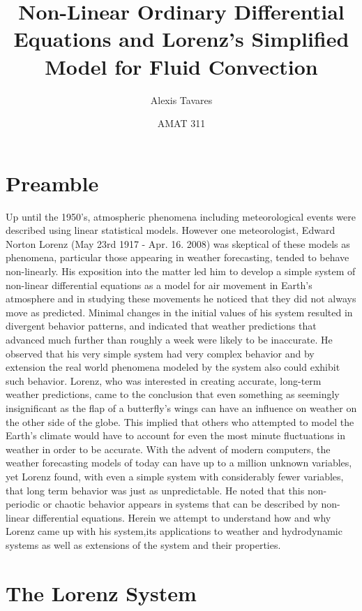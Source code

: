 \documentclass[letterpaper,titlepage,10pt]{article}
\title{Non-Linear Ordinary Differential Equations and Lorenz's Simplified Model for Fluid Convection}
\author{Alexis Tavares}
\date{AMAT 311}
\begin{document}
\maketitle{}
\tableofcontents{}
\newpage

\section{Preamble}
Up until the 1950's, atmospheric phenomena including meteorological events were described using linear statistical models. However one meteorologist, Edward Norton Lorenz (May 23rd 1917 - Apr. 16. 2008) was skeptical of these models as phenomena, particular those appearing in weather forecasting, tended to behave non-linearly.  His exposition into the matter led him to develop a  simple system of non-linear differential equations as a model for air movement in Earth's atmosphere and in studying these movements he noticed that they did not always move as predicted. Minimal changes in the initial values of his system resulted in divergent behavior patterns, and indicated that weather predictions that advanced much further than roughly a week were likely to be inaccurate.  He observed that his very simple system had very complex behavior and by extension the real world phenomena modeled by the system also could exhibit such behavior. \newline \newline
Lorenz, who was interested in creating accurate, long-term weather predictions, came to the conclusion that even something as seemingly insignificant as the flap of a butterfly's wings can have an influence on weather on the other side of the globe. This implied that others who attempted to model the Earth's climate would have to account for even the most minute fluctuations in weather in order to be accurate. With the advent of modern computers, the weather forecasting models of today can have up to a million unknown variables, yet Lorenz found, with even a simple system with considerably fewer variables, that long term behavior was just as unpredictable. He noted that this non-periodic or chaotic behavior appears in systems that can be described by non-linear differential equations. \newline \newline
Herein we attempt to understand how and why Lorenz came up with his system,its applications to weather and hydrodynamic systems as well as extensions of the system and their properties.

\section{The Lorenz System}
\end{document}
